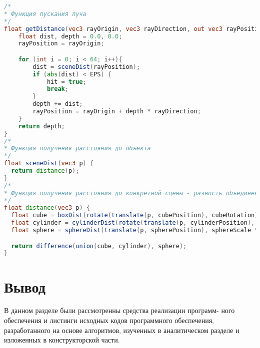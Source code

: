 \begin{lstlisting}[language=GLSL, label=lst:raymarch, caption = {Реализация алгоритмов пускания луча для отрисовки поверхностей}]
/*
* Функция пускания луча
*/
float getDistance(vec3 rayOrigin, vec3 rayDirection, out vec3 rayPosition, out vec3 normal, out bool hit) {
    float dist, depth = 0.0, 0.0;
    rayPosition = rayOrigin;

    for (int i = 0; i < 64; i++){
        dist = sceneDist(rayPosition);
        if (abs(dist) < EPS) {
            hit = true;
            break;
        }
        depth += dist;
        rayPosition = rayOrigin + depth * rayDirection;
    }
    return depth;
}
/*
* Функция получения расстояния до объекта
*/
float sceneDist(vec3 p) {
  return distance(p);
}
/*
* Функция получения расстояния до конкретной сцены - разность объединения куба и цилиндра с сферой
*/
float distance(vec3 p) {
  float cube = boxDist(rotate(translate(p, cubePosition), cubeRotation), vec3(cubeScale * 2., cubeScale * 2., cubeScale * 2.));
  float cylinder = cylinderDist(rotate(translate(p, cylinderPosition), cylinderRotation), cylinderScale * 0.5, cylinderScale * 4.0);
  float sphere = sphereDist(translate(p, spherePosition), sphereScale * 1.);

  return difference(union(cube, cylinder), sphere);
}
\end{lstlisting}
\section{Вывод}
В данном разделе были рассмотренны средства реализации программ-
ного обеспечения и листинги исходных кодов программного обеспечения,
разработанного на основе алгоритмов, изученных в аналитическом разделе и изложенных в 
конструкторской части.
